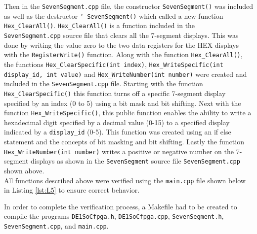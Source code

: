 \documentclass[
	letterpaper, %
	10pt, %
]{CSUniSchoolLabReport}
\begin{document}
  Then in the \texttt{SevenSegment.cpp} file, the constructor \texttt{SevenSegment()} was included as well as the destructor \texttt{\char`~SevenSegment()} which called a new function \texttt{Hex\_ClearAll()}. \texttt{Hex\_ClearAll()} is a function included in the \texttt{SevenSegment.cpp} source file that clears all the 7-segment displays. This was done by writing the value zero to the two data registers for the HEX displays with the \texttt{RegisterWrite()} function. Along with the function \texttt{Hex\_ClearAll()}, the functions \texttt{Hex\_ClearSpecific(int index)}, \texttt{Hex\_WriteSpecific(int display\_id, int value)} and \texttt{Hex\_WriteNumber(int number)} were created and included in the \texttt{SevenSegment.cpp} file. Starting with the function \texttt{Hex\_ClearSpecific()} this function turns off a specific 7-segment display specified by an index (0 to 5) using a bit mask and bit shifting. Next with the function \texttt{Hex\_WriteSpecific()}, this public function enables the ability to write a hexadecimal digit specified by a decimal value (0-15) to a specified display indicated by a \texttt{display\_id} (0-5). This function was created using an if else statement and the concepts of bit masking and bit shifting. Lastly the function \texttt{Hex\_WriteNumber(int number)} writes a positive or negative number on the 7-segment displays as shown in the \texttt{SevenSegment} source file \texttt{SevenSegment.cpp} shown above. \\

  All functions described above were verified using the \texttt{main.cpp} file shown below in Listing \ref{lst:L5} to ensure correct behavior.



  In order to complete the verification process, a Makefile had to be created to compile the programs \texttt{DE1SoCfpga.h}, \texttt{DE1SoCfpga.cpp}, \texttt{SevenSegment.h}, \texttt{SevenSegment.cpp}, and \texttt{main.cpp}. 
\end{document}

